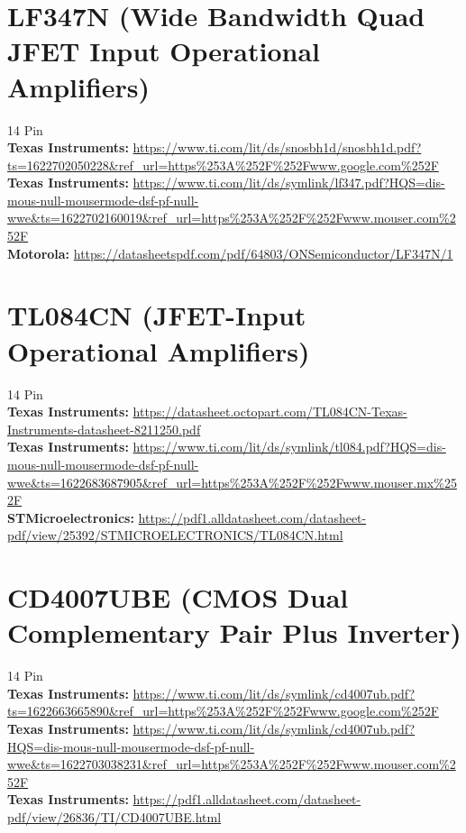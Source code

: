 \documentclass[10pt, letterpaper]{article}
\begin{document}
\section{LF347N (Wide Bandwidth Quad JFET Input Operational Amplifiers)}
14 Pin\\
\textbf{Texas Instruments: } \url{https://www.ti.com/lit/ds/snosbh1d/snosbh1d.pdf?ts=1622702050228&ref_url=https%253A%252F%252Fwww.google.com%252F}\\
\textbf{Texas Instruments: } \url{https://www.ti.com/lit/ds/symlink/lf347.pdf?HQS=dis-mous-null-mousermode-dsf-pf-null-wwe&ts=1622702160019&ref_url=https%253A%252F%252Fwww.mouser.com%252F}\\
\textbf{Motorola: } \url{https://datasheetspdf.com/pdf/64803/ONSemiconductor/LF347N/1}

\section{TL084CN (JFET-Input Operational Amplifiers)}
14 Pin\\
\textbf{Texas Instruments: } \url{https://datasheet.octopart.com/TL084CN-Texas-Instruments-datasheet-8211250.pdf}\\
\textbf{Texas Instruments: } \url{https://www.ti.com/lit/ds/symlink/tl084.pdf?HQS=dis-mous-null-mousermode-dsf-pf-null-wwe&ts=1622683687905&ref_url=https%253A%252F%252Fwww.mouser.mx%252F}\\
\textbf{STMicroelectronics: } \url{https://pdf1.alldatasheet.com/datasheet-pdf/view/25392/STMICROELECTRONICS/TL084CN.html}

\section{CD4007UBE (CMOS Dual Complementary Pair Plus Inverter)}
14 Pin\\
\textbf{Texas Instruments: } \url{https://www.ti.com/lit/ds/symlink/cd4007ub.pdf?ts=1622663665890&ref_url=https%253A%252F%252Fwww.google.com%252F}\\
\textbf{Texas Instruments: } \url{https://www.ti.com/lit/ds/symlink/cd4007ub.pdf?HQS=dis-mous-null-mousermode-dsf-pf-null-wwe&ts=1622703038231&ref_url=https%253A%252F%252Fwww.mouser.com%252F}\\
\textbf{Texas Instruments: } \url{https://pdf1.alldatasheet.com/datasheet-pdf/view/26836/TI/CD4007UBE.html}
\end{document}
